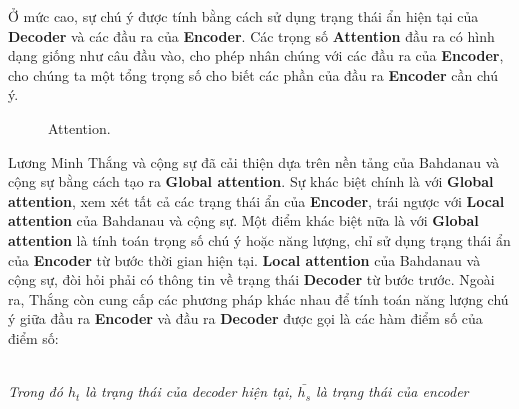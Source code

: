 Ở mức cao, sự chú ý được tính bằng cách sử dụng trạng thái ẩn hiện tại của \textbf{Decoder} và các đầu ra của
\textbf{Encoder}. Các trọng số \textbf{Attention} đầu ra có hình dạng giống như câu đầu vào, cho phép nhân
chúng với các đầu ra của \textbf{Encoder}, cho chúng ta một tổng trọng số cho biết các phần của đầu ra
\textbf{Encoder} cần chú ý.
\begin{figure}[!htb]
    \caption{\label{fig:attention} Attention.}
\end{figure}

Lương Minh Thắng và cộng sự đã cải thiện dựa trên nền tảng của Bahdanau và cộng sự bằng cách tạo ra \textbf{Global
attention}. Sự khác biệt chính là với \textbf{Global attention}, xem xét tất cả các trạng thái ẩn của
\textbf{Encoder}, trái ngược với \textbf{Local attention} của Bahdanau và cộng sự. Một điểm khác biệt nữa là với
\textbf{Global attention} là tính toán trọng số chú ý hoặc năng lượng, chỉ sử dụng trạng thái ẩn của
\textbf{Encoder} từ bước thời gian hiện tại. \textbf{Local attention} của Bahdanau và cộng sự, đòi hỏi phải có thông
tin về trạng thái \textbf{Decoder} từ bước trước. Ngoài ra, Thắng còn cung cấp các phương pháp khác nhau để tính
toán năng lượng chú ý giữa đầu ra \textbf{Encoder} và đầu ra \textbf{Decoder}  được gọi là các hàm điểm số của điểm
số: \\
\begin{figure}[!htb]
\end{figure} \\
\textit{Trong đó \(h_t\) là trạng thái của decoder hiện tại, \(\bar{h_s}\) là trạng thái của encoder}

